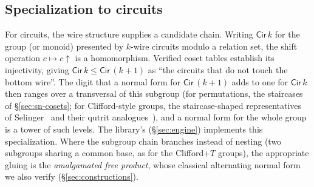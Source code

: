 \subsection{Specialization to circuits}\label{sec:circuit-chain}

For circuits, the wire structure supplies a candidate chain.  Writing $\mathsf{Cir}\,k$ for the group (or monoid) presented
by $k$-wire circuits modulo a relation set, the shift operation
$c \mapsto c{\uparrow}$ is a homomorphism.  Verified coset tables establish
its injectivity, giving
$\mathsf{Cir}\,k \le \mathsf{Cir}\,(k{+}1)$
as ``the circuits that do not touch the bottom wire''.  The digit that a
normal form for $\mathsf{Cir}\,(k{+}1)$ adds to one for $\mathsf{Cir}\,k$
then ranges over a transversal of
this subgroup (for permutations, the staircases of
\S\ref{sec:sn-cosets}; for Clifford-style groups, the staircase-shaped
representatives of Selinger~\cite{selinger2015clifford} and their qutrit
analogues~\cite{li2025qutrit}), and a normal form for the whole group is
a tower of such levels.  The library's 
(\S\ref{sec:engine}) implements this specialization.  Where the subgroup chain branches instead of nesting (two
subgroups sharing a common base, as for the Clifford+$T$ groups),
the appropriate gluing is the \emph{amalgamated free product}, whose
classical alternating normal form~\cite{magnus2004combinatorial} we
also verify (\S\ref{sec:constructions}).
